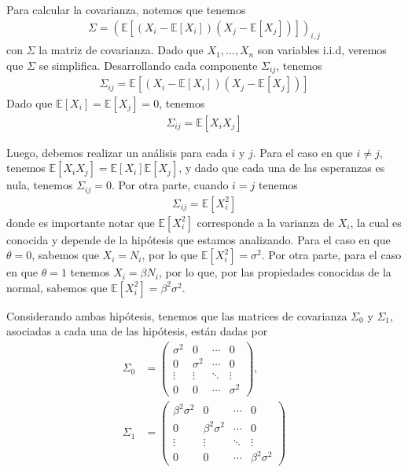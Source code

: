 \documentclass[
  11pt,
  letterpaper,
   addpoints,
   answers
  ]{exam}
\begin{document}
\begin{questions}
\begin{solution}
        Para calcular la covarianza, notemos que tenemos
        \begin{align}
        \Sigma = (\mathbb{E}[(X_i - \mathbb{E}[X_i]) (X_j - \mathbb{E}[X_j])])_{i,j}
        \end{align}
        con \(\Sigma\) la matriz de covarianza. Dado que \(X_1, \dots, X_n\) son variables i.i.d, veremos que \(\Sigma\) se simplifica. Desarrollando cada componente \(\Sigma_{ij}\), tenemos
        \begin{align}
        \Sigma_{ij} = \mathbb{E}[(X_i - \mathbb{E}[X_i]) (X_j - \mathbb{E}[X_j])]
        \end{align}
        Dado que \(\mathbb{E}[X_i] = \mathbb{E}[X_j] = 0\), tenemos
        \begin{align}
        \Sigma_{ij} = \mathbb{E}[X_i X_j]
        \end{align}
        
        Luego, debemos realizar un análisis para cada \(i\) y \(j\). Para el caso en que \(i \neq j\), tenemos \(\mathbb{E}[X_i X_j] = \mathbb{E}[X_i] \mathbb{E}[X_j]\), y dado que cada una de las esperanzas es nula, tenemos \(\Sigma_{ij} = 0\). Por otra parte, cuando \(i = j\) tenemos
        \begin{align}
        \Sigma_{ij} = \mathbb{E}[X_i^2]
        \end{align}
        donde es importante notar que \(\mathbb{E}[X_i^2]\) corresponde a la varianza de \(X_i\), la cual es conocida y depende de la hipótesis que estamos analizando. Para el caso en que \(\theta = 0\), sabemos que \(X_i = N_i\), por lo que \(\mathbb{E}[X_i^2] = \sigma^2\). Por otra parte, para el caso en que \(\theta = 1\) tenemos \(X_i = \beta N_i\), por lo que, por las propiedades conocidas de la normal, sabemos que \(\mathbb{E}[X_i^2] = \beta^2 \sigma^2\).
        
        Considerando ambas hipótesis, tenemos que las matrices de covarianza \(\Sigma_0\) y \(\Sigma_1\), asociadas a cada una de las hipótesis, están dadas por
        \begin{align}
        \Sigma_0 &= \begin{pmatrix} \sigma^2 & 0 & \cdots & 0 \\ 0 & \sigma^2 & \cdots & 0 \\ \vdots & \vdots & \ddots & \vdots \\ 0 & 0 & \cdots & \sigma^2 \end{pmatrix}, \\
        \Sigma_1 &= \begin{pmatrix} \beta^2 \sigma^2 & 0 & \cdots & 0 \\ 0 & \beta^2 \sigma^2 & \cdots & 0 \\ \vdots & \vdots & \ddots & \vdots \\ 0 & 0 & \cdots & \beta^2 \sigma^2 \end{pmatrix}
        \end{align}

\end{solution}
\end{questions}
\end{document}
